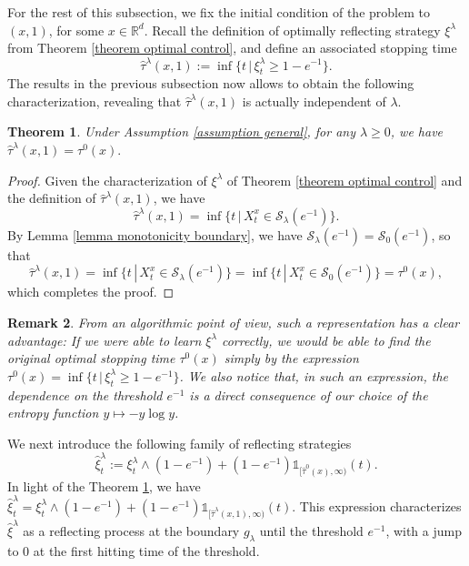 \documentclass[11pt]{amsart}
\newtheorem{theorem}{Theorem}[section]
\newtheorem{remark}[theorem]{Remark}
\theoremstyle{plain}
\def \R{\mathbb{R}}
\numberwithin{equation}{section}
\begin{document}
For the rest of this subsection, we fix the initial condition of the problem to $(x,1)$, for some $x \in \R^d$.
Recall  the definition of optimally reflecting strategy  $\xi^\lambda$ from Theorem \ref{theorem optimal control}, and define an associated stopping time
$$
\hat \tau ^\lambda (x,1) := \inf \{ t \, |\, \xi^\lambda_t \geq  1- e^{-1} \}.
$$
The results in the previous subsection now allows to obtain the following characterization, revealing that $\hat \tau ^\lambda (x,1)$ is actually independent of $\lambda$.
\begin{theorem}
    \label{theorem optimal stopping boundary representation}
   Under Assumption \ref{assumption general}, for any $\lambda \geq 0$, we have $
\hat \tau ^\lambda (x,1) = \tau ^0(x).
$
\end{theorem}
\begin{proof}
Given the characterization of $\xi^\lambda$ of Theorem \ref{theorem optimal control} and the definition of $\hat \tau ^\lambda (x,1)$, we have
$$
\hat \tau ^\lambda (x,1) =  \inf \{ t \, |\, X^x_t \in \mathcal S _\lambda (e^{-1}) \}.
$$
By Lemma \ref{lemma monotonicity boundary}, we have $\mathcal S _\lambda (e^{-1}) = \mathcal S _0 (e^{-1})$, so that
$$
\hat \tau ^\lambda (x,1) 
=  \inf \{ t \, |\, X^x_t \in \mathcal S _\lambda (e^{-1}) \}
= \inf \{ t \, |\, X^x_t \in \mathcal S _0 (e^{-1}) \}
= \tau^0(x),
$$
which completes the proof.
\end{proof}
\begin{remark}
From an algorithmic point of view, such a representation has a clear advantage: 
If we were able to learn $\xi^\lambda$ correctly, we would be able to find the original optimal stopping time $\tau^0(x)$ simply by the expression $\tau^0(x)= \inf \{ t \, |\, \xi^\lambda_t \geq 1-e^{-1} \}$.
We also notice that, in such an expression, the dependence on the threshold $e^{-1}$  is a direct consequence of our choice of the entropy function $y \mapsto -y \log y$.
\end{remark}

We next introduce the following family of reflecting strategies
\begin{equation*}
    \hat \xi ^\lambda_t := \xi^\lambda_t \land (1-e^{-1}) + (1-e^{-1}) \mathds 1 _{[\hat \tau ^0(x), \infty)} (t).
\end{equation*} 
In light of the Theorem \ref{theorem optimal stopping boundary representation}, we have
$\hat \xi ^\lambda_t = \xi^\lambda_t \land (1-e^{-1}) + (1-e^{-1}) \mathds 1 _{[\hat \tau ^\lambda(x,1), \infty)} (t)$. This expression characterizes $\hat \xi^\lambda$ as a reflecting process at the boundary $g_\lambda$ until the threshold $e^{-1}$, with a jump to $0$ at the first hitting time of the threshold. 
\end{document}
